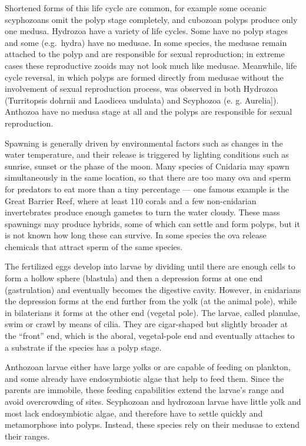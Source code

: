 \documentclass[]{book}
\begin{document}
Shortened forms of this life cycle are common, for example some oceanic scyphozoans omit the polyp stage completely, and cubozoan polyps produce only one medusa. Hydrozoa have a variety of life cycles. Some have no polyp stages and some (e.g.~hydra) have no medusae. In some species, the medusae remain attached to the polyp and are responsible for sexual reproduction; in extreme cases these reproductive zooids may not look much like medusae. Meanwhile, life cycle reversal, in which polyps are formed directly from medusae without the involvement of sexual reproduction process, was observed in both Hydrozoa (Turritopsis dohrnii and Laodicea undulata) and Scyphozoa (e. g. Aurelia{]}). Anthozoa have no medusa stage at all and the polyps are responsible for sexual reproduction.

Spawning is generally driven by environmental factors such as changes in the water temperature, and their release is triggered by lighting conditions such as sunrise, sunset or the phase of the moon. Many species of Cnidaria may spawn simultaneously in the same location, so that there are too many ova and sperm for predators to eat more than a tiny percentage --- one famous example is the Great Barrier Reef, where at least 110 corals and a few non-cnidarian invertebrates produce enough gametes to turn the water cloudy. These mass spawnings may produce hybrids, some of which can settle and form polyps, but it is not known how long these can survive. In some species the ova release chemicals that attract sperm of the same species.

The fertilized eggs develop into larvae by dividing until there are enough cells to form a hollow sphere (blastula) and then a depression forms at one end (gastrulation) and eventually becomes the digestive cavity. However, in cnidarians the depression forms at the end further from the yolk (at the animal pole), while in bilaterians it forms at the other end (vegetal pole). The larvae, called planulae, swim or crawl by means of cilia. They are cigar-shaped but slightly broader at the ``front'' end, which is the aboral, vegetal-pole end and eventually attaches to a substrate if the species has a polyp stage.

Anthozoan larvae either have large yolks or are capable of feeding on plankton, and some already have endosymbiotic algae that help to feed them. Since the parents are immobile, these feeding capabilities extend the larvae's range and avoid overcrowding of sites. Scyphozoan and hydrozoan larvae have little yolk and most lack endosymbiotic algae, and therefore have to settle quickly and metamorphose into polyps. Instead, these species rely on their medusae to extend their ranges.
\end{document}
